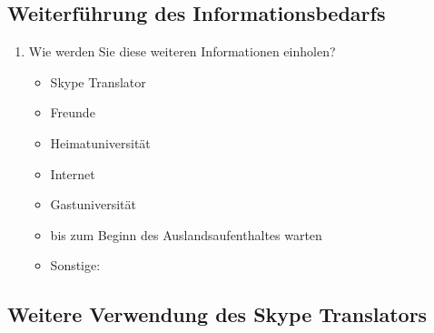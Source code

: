 \subsection*{Weiterführung des Informationsbedarfs}


\begin{enumerate}[resume]
\item Wie werden Sie diese weiteren Informationen einholen?\label{App3:Weiter}

          \begin{itemize}
           \item[\Circle] Skype Translator
           \item[\Circle] Freunde
           \item[\Circle] Heimatuniversität
           \item[\Circle] Internet
           \item[\Circle] Gastuniversität
           \item[\Circle] bis zum Beginn des Auslandsaufenthaltes warten
           \item[\Circle] Sonstige:~\underline{\hspace{7.5cm}}\\
           \end{itemize} 
\end{enumerate}
        

\subsection*{Weitere Verwendung des Skype Translators}
\label{App3:WvST}

        
